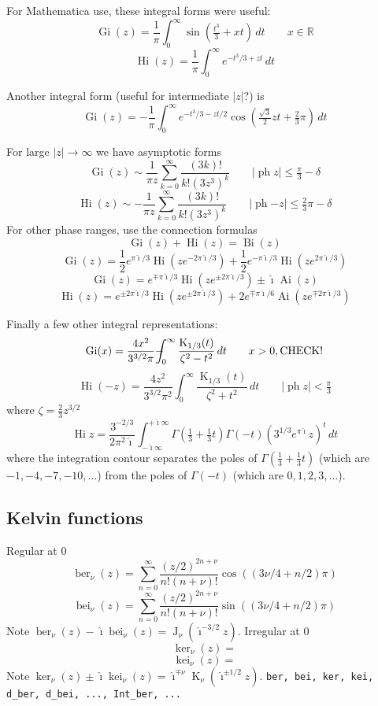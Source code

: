 \documentclass[10pt,dvipdfmx,letterpaper,twoside]{article}
\let\O=\operatorname
\newcommand{\RR}{{\mathbb{R}}}
\newcommand{\ii}{{\hat{\imath}}}
\def\Xint#1{\mathchoice
{\XXint\displaystyle\textstyle{#1}} 
{\XXint\textstyle\scriptstyle{#1}} 
{\XXint\scriptstyle\scriptscriptstyle{#1}} 
{\XXint\scriptscriptstyle\scriptscriptstyle{#1}} 
\!\int}
\def\XXint#1#2#3{{\setbox0=\hbox{$#1{#2#3}{\int}$ }
\vcenter{\hbox{$#2#3$ }}\kern-.5\wd0}}
\def\dashint{\Xint-}
\let\Gam=\Gamma
\begin{document}
For Mathematica use, these integral forms were useful:
\[ \O{Gi}(z) = \frac{1}{\pi}\int_0^\infty\sin(\tfrac{t^3}{3} + xt)\,dt \qquad x\in\RR \]
\[ \O{Hi}(z) = \frac{1}{\pi}\int_0^\infty e^{-t^3/3 + zt}\,dt \]

Another integral form (useful for intermediate $|z|$?) is
\[ \O{Gi}(z) = -\frac{1}{\pi}\int_0^\infty e^{-t^3/3 - zt/2}\cos(\tfrac{\sqrt3}{2}zt + \tfrac23\pi)\,dt \]

For large $|z|\to\infty$ we have asymptotic forms
\[ \O{Gi}(z) \sim \frac{1}{\pi z}\sum_{k=0}^\infty \frac{(3k)!}{k!(3z^3)^k} \qquad |\O{ph}z|\leq\tfrac\pi3 - \delta \]
\[ \O{Hi}(z) \sim -\frac{1}{\pi z}\sum_{k=0}^\infty \frac{(3k)!}{k!(3z^3)^k} \qquad |\O{ph} {-z}|\leq\tfrac23\pi - \delta \]
For other phase ranges, use the connection formulas
\[ \O{Gi}(z) + \O{Hi}(z) = \O{Bi}(z) \]
\[ \O{Gi}(z) = \frac12 e^{\pi\ii/3}\O{Hi}(z e^{-2\pi\ii/3}) + \frac12 e^{-\pi\ii/3}\O{Hi}(z e^{2\pi\ii/3}) \]
\[ \O{Gi}(z) = e^{\mp\pi\ii/3}\O{Hi}(z e^{\pm2\pi\ii/3}) \pm \ii \O{Ai}(z) \]
\[ \O{Hi}(z) = e^{\pm2\pi\ii/3}\O{Hi}(z e^{\pm2\pi\ii/3}) + 2 e^{\mp\pi\ii/6}\O{Ai}(z e^{\mp2\pi\ii/3}) \]

Finally a few other integral representations:
\[ \O{Gi}(x) = \frac{4x^2}{3^{3/2}\pi} \dashint_0^\infty\frac{\O{K}_{1/3}(t)}{\zeta^2 - t^2}\,dt \qquad x>0, \text{CHECK!} \]
\[ \O{Hi}(-z) = \frac{4z^2}{3^{3/2}\pi^2} \int_0^\infty\frac{\O{K}_{1/3}(t)}{\zeta^2 + t^2}\,dt \qquad |\O{ph} z|<\tfrac\pi3 \]
where $\zeta=\tfrac23z^{3/2}$
\[ \O{Hi}{z} = \frac{3^{-2/3}}{2\pi^2\ii} \int_{-\ii\infty}^{+\ii\infty} \Gam(\tfrac13+\tfrac13t)\Gam(-t)(3^{1/3}e^{\pi\ii}z)^t\,dt \]
where the integration contour separates the poles of $\Gam(\tfrac13+\tfrac13t)$ (which are $-1, -4, -7, -10, \dots$)
from the poles of $\Gam(-t)$ (which are $0, 1, 2, 3, \dots$).

\subsection{Kelvin functions}
Regular at 0
\[ \O{ber}_\nu(z) = \sum_{n=0}^\infty \frac{(z/2)^{2n+\nu}}{n!(n+\nu)!}\cos( (3\nu/4 + n/2) \pi)\]
\[ \O{bei}_\nu(z) = \sum_{n=0}^\infty \frac{(z/2)^{2n+\nu}}{n!(n+\nu)!}\sin( (3\nu/4 + n/2) \pi)\]
Note $\O{ber}_\nu(z) - \ii\O{bei}_\nu(z) = \O{J}_\nu(\ii^{-3/2}z)$.
Irregular at 0
\[ \O{ker}_\nu(z) = \]
\[ \O{kei}_\nu(z) = \]
Note $\O{ker}_\nu(z) \pm \ii\O{kei}_\nu(z) = \ii^{\mp\nu}\O{K}_\nu(\ii^{\pm1/2}z)$.
{\tt ber, bei, ker, kei, d\_ber, d\_bei, ..., Int\_ber, ...}
\end{document}
